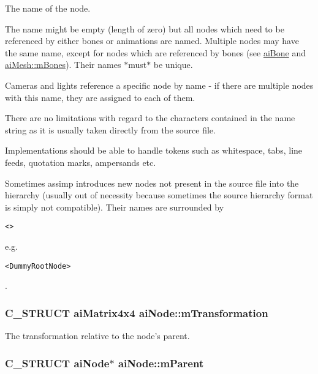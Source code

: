 The name of the node.

The name might be empty (length of zero) but all nodes which need to be referenced by either bones or animations are named. Multiple nodes may have the same name, except for nodes which are referenced by bones (see \hyperlink{structai_bone}{aiBone} and \hyperlink{structai_mesh_0c0582a7f45b340b6a33552c53232539}{aiMesh::mBones}). Their names $\ast$must$\ast$ be unique.

Cameras and lights reference a specific node by name - if there are multiple nodes with this name, they are assigned to each of them. \par
 There are no limitations with regard to the characters contained in the name string as it is usually taken directly from the source file.

Implementations should be able to handle tokens such as whitespace, tabs, line feeds, quotation marks, ampersands etc.

Sometimes assimp introduces new nodes not present in the source file into the hierarchy (usually out of necessity because sometimes the source hierarchy format is simply not compatible). Their names are surrounded by 

\footnotesize\begin{verbatim}<> \end{verbatim}
\normalsize
 e.g. 

\footnotesize\begin{verbatim}<DummyRootNode> \end{verbatim}
\normalsize
. \hypertarget{structai_node_adb69c766c7658bba9d2195af16d6831}{
\subsubsection[mTransformation]{\setlength{\rightskip}{0pt plus 5cm}C\_\-STRUCT aiMatrix4x4 {\bf aiNode::mTransformation}}}
\label{structai_node_adb69c766c7658bba9d2195af16d6831}


The transformation relative to the node's parent. \hypertarget{structai_node_a6896b42c78e784db85d822a4c8dd404}{
\subsubsection[mParent]{\setlength{\rightskip}{0pt plus 5cm}C\_\-STRUCT {\bf aiNode}$\ast$ {\bf aiNode::mParent}}}
\label{structai_node_a6896b42c78e784db85d822a4c8dd404}


